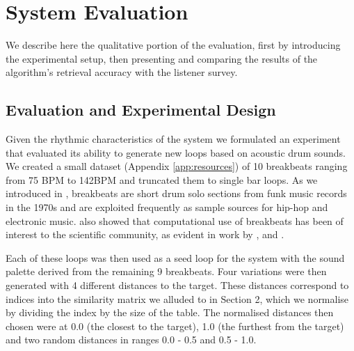 
\section{System Evaluation}

We describe here the qualitative portion of the evaluation, first by introducing the experimental setup, then presenting and comparing the results of the algorithm’s retrieval accuracy with the listener survey.

\subsection{Evaluation and Experimental Design}
\label{sec:break_evaluation}

Given the rhythmic characteristics of the system we formulated an experiment that evaluated its ability to generate new loops based on acoustic drum sounds. We created a small dataset (Appendix \ref{app:resources}) of 10 breakbeats ranging from 75 BPM to 142BPM and truncated them to single bar loops. As we introduced in , breakbeats are short drum solo sections from funk music records in the 1970s and are exploited frequently as sample sources for hip-hop and electronic music.  also showed that computational use of breakbeats has been of interest to the scientific community, as evident in work by \cite{Ravelli2007}, \cite{Hockman2015} and \cite{Collins2006}.

Each of these loops was then used as a seed loop for the system with the sound palette derived from the remaining 9 breakbeats. Four variations were then generated with 4 different distances to the target.  These distances correspond to indices into the similarity matrix we alluded to in Section 2, which we normalise by dividing the index by the size of the table. The normalised distances then chosen were at 0.0 (the closest to the target), 1.0 (the furthest from the target) and two random distances in ranges 0.0 - 0.5 and 0.5 - 1.0.

